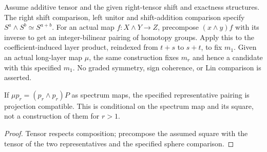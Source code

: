 \begin{definition}
  \label{def:h6-specified-sphere-pairing}
  \leanok
  Assume additive tensor and the given right-tensor shift and exactness
  structures. The right shift comparison, left unitor and shift-addition
  comparison specify $S^a\wedge S^b\simeq S^{a+b}$. For an actual map
  $f:X\wedge Y\to Z$, precompose $(x\wedge y)f$ with its inverse to get
  an integer-bilinear pairing of homotopy groups. Apply this to the
  coefficient-induced layer product, reindexed from $t+s$ to $s+t$, to
  fix $m_1$. Given an actual long-layer map $\mu$, the same construction
  fixes $m_r$ and hence a candidate with this specified $m_1$.
  No graded symmetry, sign coherence, or Lin comparison is asserted.
\end{definition}

\begin{proposition}
  \label{prop:h6-sphere-pairing-projection}
  \leanok
  If $\mu p_r=(p_r\wedge p_r)P$ as spectrum maps, the specified
  representative pairing is projection compatible. This is conditional on
  the spectrum map and its square, not a construction of them for $r>1$.
\end{proposition}
\begin{proof}
  Tensor respects composition; precompose the assumed square with the
  tensor of the two representatives and the specified sphere comparison.
  \leanok
\end{proof}

